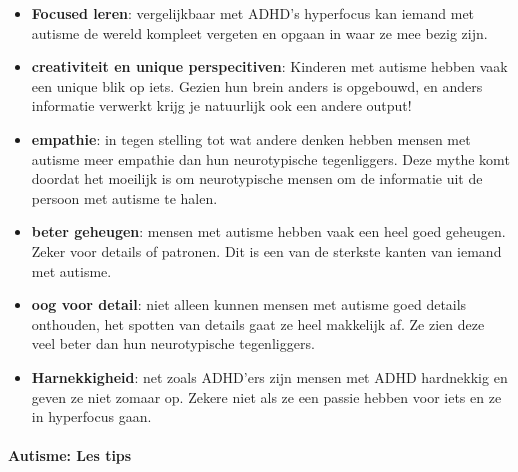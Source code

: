 \documentclass{article}
\begin{document}
                    \begin{itemize}
                        \item \textbf{Focused leren}\cite{autisme-upsides}: 
                            vergelijkbaar met ADHD's hyperfocus kan iemand met autisme de wereld kompleet vergeten en opgaan in waar ze mee bezig zijn.
                        \item \textbf{creativiteit en unique perspecitiven}\cite{autisme-upsides}:
                            Kinderen met autisme hebben vaak een unique blik op iets. Gezien hun brein anders is opgebouwd, en anders informatie verwerkt krijg je natuurlijk ook een andere output!
                        \item \textbf{empathie}\cite{autisme-upsides}: 
                            in tegen stelling tot wat andere denken hebben mensen met autisme meer empathie dan hun neurotypische tegenliggers. Deze mythe komt doordat het moeilijk is om neurotypische mensen om de informatie uit de persoon met autisme te halen.
                        \item \textbf{beter geheugen}\cite{autisme-upsides}: 
                            mensen met autisme hebben vaak een heel goed geheugen. Zeker voor details of patronen. Dit is een van de sterkste kanten van iemand met autisme.
                        \item \textbf{oog voor detail}\cite{autisme-upsides}: 
                            niet alleen kunnen mensen met autisme goed details onthouden, het spotten van details gaat ze heel makkelijk af. Ze zien deze veel beter dan hun neurotypische tegenliggers.
                        \item \textbf{Harnekkigheid}\cite{autisme-upsides}:
                            net zoals ADHD'ers zijn mensen met ADHD hardnekkig en geven ze niet zomaar op. Zekere niet als ze een passie hebben voor iets en ze in hyperfocus gaan.
                    \end{itemize}                    
                
                \bigskip\noindent\paragraph{Autisme: Les tips}
                
\end{document}
